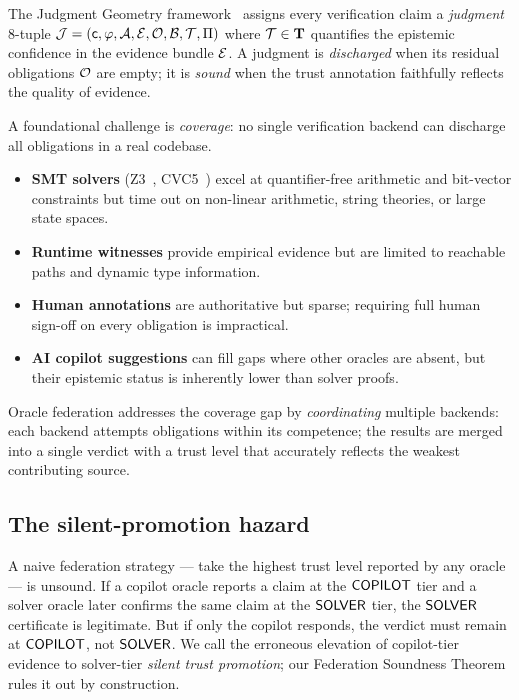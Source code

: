 \documentclass[11pt]{article}
\newcommand{\TierSet}{\mathbf{T}}           %
\begin{document}
The Judgment Geometry framework~\cite{jugeo02} assigns every
verification claim a \emph{judgment} 8-tuple
$\mathcal{J} = (\mathsf{c}, \varphi, \mathcal{A}, \mathcal{E}, \mathcal{O}, \mathcal{B}, \mathcal{T}, \Pi)$
where $\trust \in \TierSet$ quantifies the epistemic confidence in the
evidence bundle $\mathcal{E}$.  A judgment is \emph{discharged} when its
residual obligations $\mathcal{O}$ are empty; it is \emph{sound} when the
trust annotation faithfully reflects the quality of evidence.

A foundational challenge is \emph{coverage}: no single verification
backend can discharge all obligations in a real codebase.
\begin{itemize}[nosep]
  \item \textbf{SMT solvers} (Z3~\cite{z3}, CVC5~\cite{cvc5}) excel at
        quantifier-free arithmetic and bit-vector constraints but time out
        on non-linear arithmetic, string theories, or large state spaces.
  \item \textbf{Runtime witnesses} provide empirical evidence but are
        limited to reachable paths and dynamic type information.
  \item \textbf{Human annotations} are authoritative but sparse;
        requiring full human sign-off on every obligation is impractical.
  \item \textbf{AI copilot suggestions} can fill gaps where other oracles
        are absent, but their epistemic status is inherently lower than
        solver proofs.
\end{itemize}

Oracle federation addresses the coverage gap by \emph{coordinating}
multiple backends: each backend attempts obligations within its
competence; the results are merged into a single verdict with a trust
level that accurately reflects the weakest contributing source.

\subsection{The silent-promotion hazard}

A naive federation strategy — take the highest trust level reported by
any oracle — is unsound.  If a copilot oracle reports a claim at the
$\mathsf{COPILOT}$ tier and a solver oracle later confirms the same claim at the
$\mathsf{SOLVER}$ tier, the $\mathsf{SOLVER}$ certificate is legitimate.  But if only
the copilot responds, the verdict must remain at $\mathsf{COPILOT}$, not
$\mathsf{SOLVER}$.  We call the erroneous elevation of copilot-tier evidence to
solver-tier \emph{silent trust promotion}; our Federation Soundness
Theorem rules it out by construction.
\end{document}
